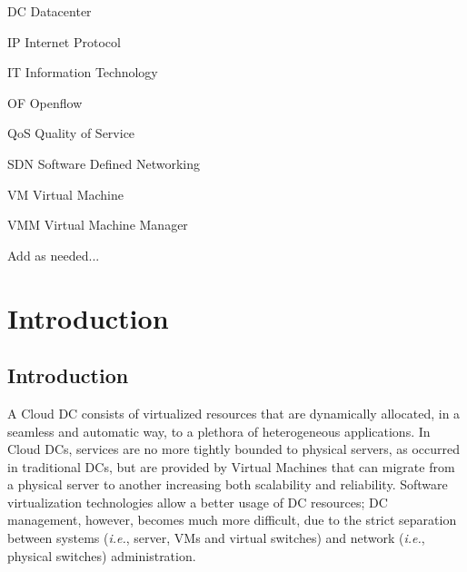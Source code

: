 \documentclass[12pt,english,oneside]{book}
\newenvironment{lyxlist}[1]
   {\begin{list}{}
     {\settowidth{\labelwidth}{#1}
      \setlength{\leftmargin}{\labelwidth}
      \addtolength{\leftmargin}{\labelsep}
      \renewcommand{\makelabel}[1]{##1\hfil}}}
   {\end{list}}
\begin{document}


\begin{lyxlist}{00.00.0000}
\begin{singlespace}
\item [DC]Datacenter
\item [IP]Internet Protocol 
\item [IT]Information Technology
\item [OF]Openflow
\item [QoS] Quality of Service
\item [SDN]Software Defined Networking
\item [VM]Virtual Machine
\item [VMM]Virtual Machine Manager
\item Add as needed...
\end{singlespace}
\end{lyxlist}


\listoffigures


\listoftables


\setcounter{page}{0}



\chapter{Introduction\label{cha:introduction}}

\section{Introduction}
\hspace{0.6cm}

A Cloud DC consists of virtualized resources that are dynamically allocated, in a seamless and automatic way, to a plethora of heterogeneous applications.
In Cloud DCs, services are no more tightly bounded to physical servers, as occurred in traditional DCs, but are provided by Virtual Machines that can migrate from a physical server to another increasing both scalability and reliability.
Software virtualization technologies allow a better usage of DC resources; DC management, however, becomes much more difficult, due to the strict separation between systems (\textit{i.e.}, server, VMs and virtual switches) and network (\textit{i.e.}, physical switches) administration.
\end{document}

